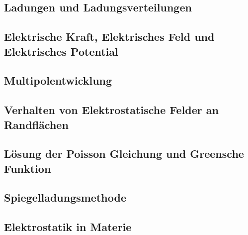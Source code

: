 \subsection{Ladungen und Ladungsverteilungen}%
\label{sub:Ladungen-und-Ladungsverteilungen}


\newpage
\subsection{Elektrische Kraft, Elektrisches Feld und Elektrisches Potential}%
\label{sub:Ladungen-und-Ladungsverteilungen}


\newpage
\subsection{Multipolentwicklung}%
\label{sub:Multipolentwicklung}


\newpage
\subsection{Verhalten von Elektrostatische Felder an Randflächen}%

\newpage
\subsection{Lösung der Poisson Gleichung und Greensche Funktion}%

\newpage
\subsection{Spiegelladungsmethode}%

\newpage
\subsection{Elektrostatik in Materie}%
